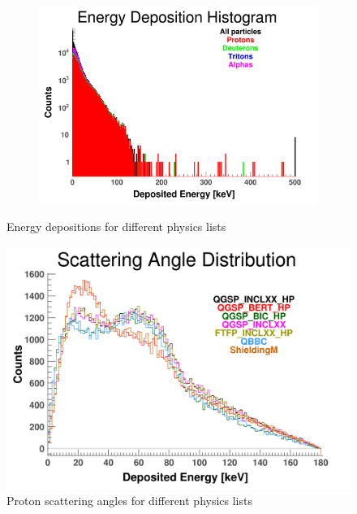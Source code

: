 \documentclass[10pt,a4paper]{report}
\begin{document}
\begin{figure}[htbp]
    \begin{subfigure}[htbp]{0.42\textwidth}
        \label{fig:E7}
        \includegraphics[width=\textwidth]{./E7_ShieldingM_Edep.png}
    \end{subfigure}
    \caption{Energy depositions for different physics lists} 
    \label{fig:Edep}
\end{figure}


\begin{figure}
\centering
  \includegraphics[width=1.00\textwidth]{./ProtonScattering.png}
  \caption{Proton scattering angles for different physics lists}  
  \label{fig:ProtonAlpha}
\end{figure}
\end{document}
